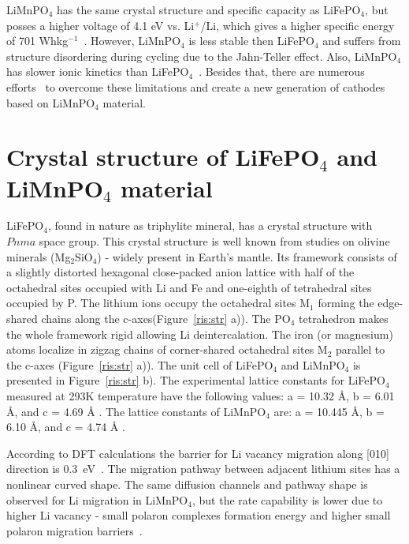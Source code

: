 LiMnPO$_4$  has the same crystal structure and specific capacity as LiFePO$_4$, but posses a higher voltage of 4.1 eV vs. Li$^+$/Li, which gives a higher specific energy of 701 Whkg$^{-1}$~\cite{aravindan2013limnpo}. 
However, LiMnPO$_4$ is less stable then LiFePO$_4$ and suffers from structure disordering during cycling due to the Jahn-Teller effect. Also, LiMnPO$_4$ has slower ionic kinetics than LiFePO$_4$~\cite{yamada2006electrochemical}.
Besides that, there are numerous efforts~\cite{arvcon2004comparative,xu2017improvement} to overcome these limitations and create a new generation of cathodes based on LiMnPO$_4$ material.

\section{Crystal structure of LiFePO$_4$ and LiMnPO$_4$ material}

LiFePO$_4$, found in nature as triphylite mineral, has a crystal structure with $Pnma$ space group. This crystal structure is well known from studies on olivine minerals (Mg$_2$SiO$_4$) - widely present in Earth's mantle. Its framework consists of a slightly distorted hexagonal close-packed anion lattice with half of the octahedral sites occupied with Li and Fe and one-eighth of tetrahedral sites occupied by P. The lithium ions occupy the octahedral sites M$_1$ forming the edge-shared chains along the c-axes(Figure~\ref{ris:str} a)). The PO$_4$ tetrahedron makes the whole framework rigid  allowing Li deintercalation. The iron (or magnesium) atoms localize in zigzag chains of corner-shared octahedral sites M$_2$ parallel to the c-axes (Figure~\ref{ris:str} a)). The unit cell of LiFePO$_4$ and LiMnPO$_4$ is presented in Figure~\ref{ris:str} b). The experimental lattice constants for LiFePO$_4$ measured at 293K temperature  have the following values: a = 10.32 Å, b = 6.01 Å, and c = 4.69 Å \cite{urusova2017magnetic}. The lattice constants of LiMnPO$_4$ are: a = 10.445 Å, b = 6.10 Å, and c = 4.74 Å \cite{urusova2017magnetic}.

According to DFT calculations the barrier for Li vacancy migration along [010] direction is 0.3~eV~\cite{aksyonov2018understanding}. The migration pathway between adjacent lithium sites has a nonlinear curved shape. The same diffusion channels and pathway shape is observed for Li migration in LiMnPO$_4$, but the rate capability is lower due to higher Li vacancy - small polaron complexes formation energy and higher small polaron migration barriers~\cite{ong2011comparison}.

